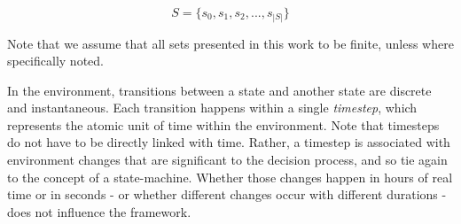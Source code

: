 \[ S = \{s_0, s_1, s_2, ..., s_{|S|}\} \]

Note that we assume that all sets presented in this work to be finite, unless where specifically
noted.


In the environment, transitions between a state and another state are discrete and instantaneous.
Each transition happens within a single \textit{timestep}, which represents the atomic unit of time
within the environment. Note that timesteps do not have to be directly linked with time. Rather, a
timestep is associated with environment changes that are significant to the decision process, and so
tie again to the concept of a state-machine. Whether those changes happen in hours of real time or
in seconds - or whether different changes occur with different durations - does not influence the
framework.  

%

